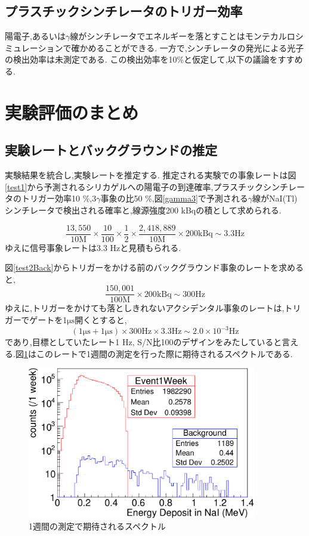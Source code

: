 \subsection{プラスチックシンチレータのトリガー効率}
陽電子,あるいは$\gamma$線がシンチレータでエネルギーを落とすことはモンテカルロシミュレーションで確かめることができる.
一方で,シンチレータの発光による光子の検出効率は未測定である.
この検出効率を10\%と仮定して,以下の議論をすすめる.

\section{実験評価のまとめ}
\label{section_testall}

\subsection{実験レートとバックグラウンドの推定}
実験結果を統合し,実験レートを推定する.
推定される実験での事象レートは図\ref{test1}から予測されるシリカゲルへの陽電子の到達確率,プラスチックシンチレータのトリガー効率10 \%,$3\gamma$事象の比50 \%,図\ref{gamma3}で予測される$\gamma$線がNaI(Tl)シンチレータで検出される確率と,線源強度200 kBqの積として求められる.

\begin{equation}
	\nonumber
	\frac{13,550}{10 \mathrm{M}} \times \frac{10}{100} \times \frac{1}{2} \times \frac{2,418,889}{10 \mathrm{M}} \times 200 \mathrm{kBq} \sim 3.3 \mathrm{Hz}
\end{equation}
ゆえに信号事象レートは3.3 Hzと見積もられる.

図\ref{test2Back}からトリガーをかける前のバックグラウンド事象のレートを求めると,
\begin{equation}
	\nonumber
	\frac{150,001}{100\mathrm{M}} \times 200 \mathrm{kBq} \sim 300 \mathrm{ Hz}
\end{equation}
ゆえに,トリガーをかけても落としきれないアクシデンタル事象のレートは,トリガーでゲートを1$\si{\micro \second}$開くとすると,
\begin{equation}
	\nonumber
	( 1 \si{\micro \second} + 1 \si{\micro \second}) \times  300 \mathrm{Hz} \times 3.3 \mathrm{Hz} \sim 2.0 \times 10^{-3} \mathrm{Hz}
\end{equation}
であり,目標としていたレート1 Hz, S/N比100のデザインをみたしていると言える.図\ref{test_all}はこのレートで1週間の測定を行った際に期待されるスペクトルである.

\begin{figure}[!tbp]
	\centering
		\includegraphics[width=10cm]{fig/test_all.pdf}
	\caption{1週間の測定で期待されるスペクトル}
	\label{test_all}
\end{figure}

